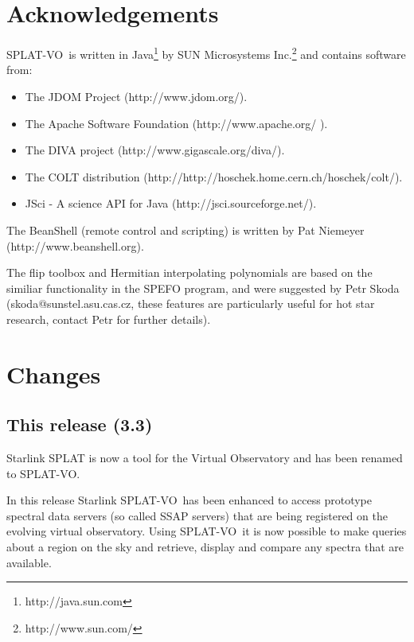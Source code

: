 \documentclass[twoside,11pt]{article}
\newcommand{\htmladdnormallinkfoot}[2]{#1\footnote{#2}}
\newcommand{\htmladdnormallink}[2]{#1}
\renewcommand{\_}{\texttt{\symbol{95}}}
\newcommand{\SPLAT}{\textsf{SPLAT-VO}}
\begin{document}
\section{Acknowledgements}

\SPLAT\ is written in
\htmladdnormallinkfoot{Java}{http://java.sun.com} by
\htmladdnormallinkfoot{SUN Microsystems Inc.}{http://www.sun.com/} and
contains software from:
\begin{itemize}
\item The JDOM Project (\htmladdnormallink{http://www.jdom.org/}
                        {http://www.jdom.org/}).
\item The Apache Software Foundation
      (\htmladdnormallink{http://www.apache.org/}{http://www.apache.org/} ).
\item The DIVA project
      (\htmladdnormallink{http://www.gigascale.org/diva/}
                         {http://www.gigascale.org/diva/}).
\item The COLT distribution
      (\htmladdnormallink{http://http://hoschek.home.cern.ch/hoschek/colt/}
                         {http://http://hoschek.home.cern.ch/hoschek/colt/}).
\item JSci - A science API for Java
      (\htmladdnormallink{http://jsci.sourceforge.net/}
                         {http://jsci.sourceforge.net/}).
\end{itemize}

The BeanShell (remote control and scripting) is written by Pat
Niemeyer (\htmladdnormallink{http://www.beanshell.org}
                            {http://www.beanshell.org}).

The flip toolbox and Hermitian interpolating polynomials are based on the
similiar functionality in the SPEFO program, and were suggested by Petr Skoda
(skoda@sunstel.asu.cas.cz, these features are particularly useful for hot star
research, contact Petr for further details).

\section{Changes}

\subsection{This release (3.3)}

Starlink SPLAT is now a tool for the Virtual Observatory and has been
renamed to \SPLAT.

In this release Starlink \SPLAT\ has been enhanced to access prototype
spectral data servers (so called SSAP servers) that are being registered on
the evolving virtual observatory. Using \SPLAT\ it is now possible to make
queries about a region on the sky and retrieve, display and compare any
spectra that are available.
\end{document}
